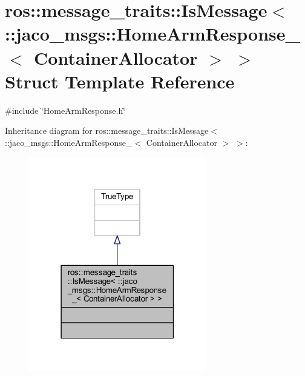 \hypertarget{structros_1_1message__traits_1_1IsMessage_3_01_1_1jaco__msgs_1_1HomeArmResponse___3_01ContainerAllocator_01_4_01_4}{}\section{ros\+:\+:message\+\_\+traits\+:\+:Is\+Message$<$ \+:\+:jaco\+\_\+msgs\+:\+:Home\+Arm\+Response\+\_\+$<$ Container\+Allocator $>$ $>$ Struct Template Reference}
\label{structros_1_1message__traits_1_1IsMessage_3_01_1_1jaco__msgs_1_1HomeArmResponse___3_01ContainerAllocator_01_4_01_4}


{\ttfamily \#include \char`\"{}Home\+Arm\+Response.\+h\char`\"{}}



Inheritance diagram for ros\+:\+:message\+\_\+traits\+:\+:Is\+Message$<$ \+:\+:jaco\+\_\+msgs\+:\+:Home\+Arm\+Response\+\_\+$<$ Container\+Allocator $>$ $>$\+:
\nopagebreak
\begin{figure}[H]
\begin{center}
\leavevmode
\includegraphics[width=219pt]{d7/d23/structros_1_1message__traits_1_1IsMessage_3_01_1_1jaco__msgs_1_1HomeArmResponse___3_01ContainerA298604dcaf91a059a78c74559af6e26d}
\end{center}
\end{figure}


